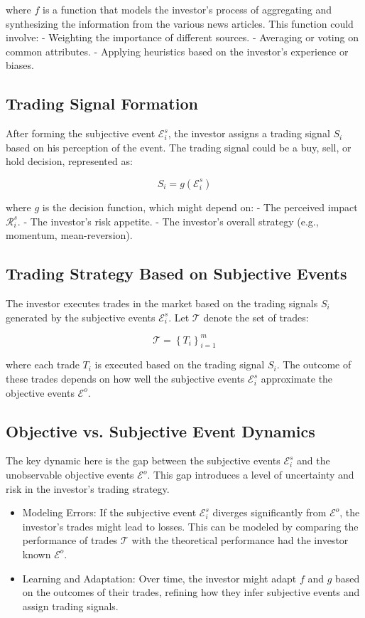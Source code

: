 \documentclass[12pt,article]{memoir}
\begin{document}
where $f$ is a function that models the investor's process of aggregating and synthesizing the information from the various news articles. This function could involve:
- Weighting the importance of different sources.
- Averaging or voting on common attributes.
- Applying heuristics based on the investor's experience or biases.

\subsection{Trading Signal Formation}

After forming the subjective event $\mathcal{E}_i^s$, the investor assigns a trading signal $S_i$ based on his perception of the event. The trading signal could be a buy, sell, or hold decision, represented as:

$$
S_i=g\left(\mathcal{E}_i^s\right)
$$

where $g$ is the decision function, which might depend on:
- The perceived impact $\mathcal{R}_i^s$.
- The investor's risk appetite.
- The investor's overall strategy (e.g., momentum, mean-reversion).

\subsection{Trading Strategy Based on Subjective Events}

The investor executes trades in the market based on the trading signals $S_i$ generated by the subjective events $\mathcal{E}_i^s$. Let $\mathcal{T}$ denote the set of trades:

$$
\mathcal{T}=\left\{T_i\right\}_{i=1}^m
$$

where each trade $T_i$ is executed based on the trading signal $S_i$. The outcome of these trades depends on how well the subjective events $\mathcal{E}_i^s$ approximate the objective events $\mathcal{E}^o$.

\subsection{Objective vs. Subjective Event Dynamics}
The key dynamic here is the gap between the subjective events $\mathcal{E}_i^s$ and the unobservable objective events $\mathcal{E}^o$. This gap introduces a level of uncertainty and risk in the investor's trading strategy.
\begin{itemize}
  \item Modeling Errors: If the subjective event $\mathcal{E}_i^s$ diverges significantly from $\mathcal{E}^o$, the investor's trades might lead to losses. This can be modeled by comparing the performance of trades $\mathcal{T}$ with the theoretical performance had the investor known $\mathcal{E}^o$.
  \item Learning and Adaptation: Over time, the investor might adapt $f$ and $g$ based on the outcomes of their trades, refining how they infer subjective events and assign trading signals.
\end{itemize}
\end{document}
